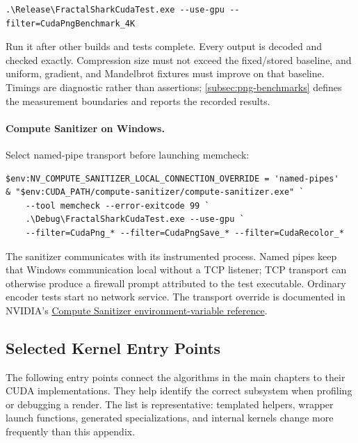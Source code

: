 \begin{lstlisting}[language={},upquote=true]
.\Release\FractalSharkCudaTest.exe --use-gpu --filter=CudaPngBenchmark_4K
\end{lstlisting}

Run it after other builds and tests complete. Every output is decoded
and checked exactly. Compression size must not exceed the fixed/stored
baseline, and uniform, gradient, and Mandelbrot fixtures must improve
on that baseline. Timings are diagnostic rather than assertions;
\cref{subsec:png-benchmarks} defines the measurement boundaries and
reports the recorded results.

\paragraph{Compute Sanitizer on Windows.}
Select named-pipe transport before launching memcheck:

\begin{lstlisting}[language={},upquote=true]
$env:NV_COMPUTE_SANITIZER_LOCAL_CONNECTION_OVERRIDE = 'named-pipes'
& "$env:CUDA_PATH/compute-sanitizer/compute-sanitizer.exe" `
    --tool memcheck --error-exitcode 99 `
    .\Debug\FractalSharkCudaTest.exe --use-gpu `
    --filter=CudaPng_* --filter=CudaPngSave_* --filter=CudaRecolor_*
\end{lstlisting}

The sanitizer communicates with its instrumented process. Named pipes
keep that Windows communication local without a TCP listener; TCP
transport can otherwise produce a firewall prompt attributed to the
test executable. Ordinary encoder tests start no network service.
The transport override is documented in NVIDIA's
\href{https://docs.nvidia.com/compute-sanitizer/ComputeSanitizer/index.html\#environment-variables}
{Compute Sanitizer environment-variable reference}.

\subsection{Selected Kernel Entry Points}
\label{sec:kernel-list}

The following entry points connect the algorithms in the main chapters to
their CUDA implementations. They help identify the correct subsystem when
profiling or debugging a render. The list is representative: templated helpers,
wrapper launch functions, generated specializations, and internal kernels
change more frequently than this appendix.

